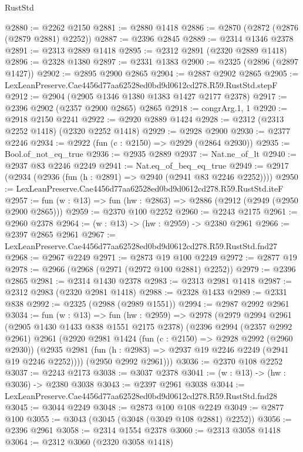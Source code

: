 \begin{lexlean}{RustStd}
\begin{coremodule}
@2880 := @2262 @2150
@2881 := @2880 @1418
@2886 := @2870 (@2872 (@2876 (@2879 @2881) @2252))
@2887 := @2396 @2845
@2889 := @2314 @1346 @2378
@2891 := @2313 @2889 @1418
@2895 := @2312 @2891 (@2320 @2889 @1418)
@2896 := @2328 @1380
@2897 := @2331 @1383
@2900 := @2325 (@2896 (@2897 @1427))
@2902 := @2895 @2900 @2865
@2904 := @2887 @2902 @2865
@2905 := LexLeanPreserve.Cae4456d77aa62528ed0bd9d0612cd278.R59.RustStd.stepF
@2912 := @2904 (@2905 @1346 @1380 @1383 @1427 @2177 @2378)
@2917 := @2396 @2902 (@2357 @2900 @2865) @2865
@2918 := congrArg.{1, 1}
@2920 := @2918 @2150 @2241
@2922 := @2920 @2889 @1424
@2928 := @2312 (@2313 @2252 @1418) (@2320 @2252 @1418)
@2929 := @2928 @2900
@2930 := @2377 @2246
@2934 := @2922 (fun (c : @2150) => @2929 (@2864 @2930))
@2935 := Bool.of_not_eq_true
@2936 := @2935 @2889
@2937 := Nat.ne_of_lt
@2940 := @2937 @83 @2246 @2249
@2941 := Nat.eq_of_beq_eq_true
@2949 := @2917 (@2934 (@2936 (fun (h : @2891) => @2940 (@2941 @83 @2246 @2252))))
@2950 := LexLeanPreserve.Cae4456d77aa62528ed0bd9d0612cd278.R59.RustStd.iteF
@2957 := fun (w : @13) => fun (hw : @2863) => @2886 (@2912 (@2949 (@2950 @2900 @2865)))
@2959 := @2370 @100 @2252
@2960 := @2243 @2175
@2961 := @2960 @2378
@2964 := (w : @13) -> (hw : @2959) -> @2380 @2961
@2966 := @2397 @2865 @2961
@2967 := LexLeanPreserve.Cae4456d77aa62528ed0bd9d0612cd278.R59.RustStd.fnd27
@2968 := @2967 @2249
@2971 := @2873 @19 @100 @2249
@2972 := @2877 @19
@2978 := @2966 (@2968 (@2971 (@2972 @100 @2881) @2252))
@2979 := @2396 @2865
@2981 := @2314 @1430 @2378
@2983 := @2313 @2981 @1418
@2987 := @2312 @2983 (@2320 @2981 @1418)
@2988 := @2328 @1433
@2989 := @2331 @838
@2992 := @2325 (@2988 (@2989 @1551))
@2994 := @2987 @2992 @2961
@3034 := fun (w : @13) =>
  fun (hw : @2959) =>
  @2978
    (@2979
      @2994
      @2961
      (@2905 @1430 @1433 @838 @1551 @2175 @2378)
      (@2396
        @2994
        (@2357 @2992 @2961)
        @2961
        (@2920
          @2981
          @1424
          (fun (c : @2150) => @2928 @2992 (@2960 @2930))
          (@2935 @2981 (fun (h : @2983) => @2937 @19 @2246 @2249 (@2941 @19 @2246 @2252))))
        (@2950 @2992 @2961)))
@3036 := @2370 @108 @2252
@3037 := @2243 @2173
@3038 := @3037 @2378
@3041 := (w : @13) -> (hw : @3036) -> @2380 @3038
@3043 := @2397 @2961 @3038
@3044 := LexLeanPreserve.Cae4456d77aa62528ed0bd9d0612cd278.R59.RustStd.fnd28
@3045 := @3044 @2249
@3048 := @2873 @100 @108 @2249
@3049 := @2877 @100
@3055 := @3043 (@3045 (@3048 (@3049 @108 @2881) @2252))
@3056 := @2396 @2961
@3058 := @2314 @1554 @2378
@3060 := @2313 @3058 @1418
@3064 := @2312 @3060 (@2320 @3058 @1418)

\end{coremodule}
\end{lexlean}
